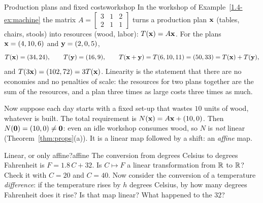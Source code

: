 \documentclass[11pt]{article}
\begin{document}
\begin{exmp}{Production plans and fixed costs}{workshop}
In the workshop of Example~\ref{1.4-ex:machine} the matrix $A=\begin{bmatrix}3&1&2\\2&1&1\end{bmatrix}$ turns a production plan $\mathbf{x}$ (tables, chairs, stools) into resources (wood, labor): $T(\mathbf{x})=A\mathbf{x}$. For the plans $\mathbf{x}=(4,10,6)$ and $\mathbf{y}=(2,0,5)$,
\[
T(\mathbf{x})=(34,24),\qquad T(\mathbf{y})=(16,9),\qquad T(\mathbf{x}+\mathbf{y})=T(6,10,11)=(50,33)=T(\mathbf{x})+T(\mathbf{y}),
\]
and $T(3\mathbf{x})=(102,72)=3T(\mathbf{x})$. Linearity is the statement that there are no economies and no penalties of scale: the resources for two plans together are the sum of the resources, and a plan three times as large costs three times as much.

Now suppose each day starts with a fixed set-up that wastes $10$ units of wood, whatever is built. The total requirement is $N(\mathbf{x})=A\mathbf{x}+(10,0)$. Then $N(\mathbf{0})=(10,0)\neq\mathbf{0}$: even an idle workshop consumes wood, so $N$ is \emph{not} linear (Theorem~\ref{thm:props}(a)). It is a linear map followed by a shift: an \emph{affine} map.
\end{exmp}

\begin{think}{Linear, or only affine?}{affine}
The conversion from degrees Celsius to degrees Fahrenheit is $F=1.8\,C+32$. Is $C\mapsto F$ a linear transformation from $\mathbb{R}$ to $\mathbb{R}$? Check it with $C=20$ and $C=40$. Now consider the conversion of a temperature \emph{difference}: if the temperature rises by $h$ degrees Celsius, by how many degrees Fahrenheit does it rise? Is that map linear? What happened to the $32$?
\end{think}
\end{document}
